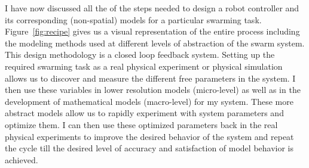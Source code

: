 \documentclass[defaultstyle,12pt]{proposal}
\begin{document}
I have now discussed all the of the steps needed to design a robot controller and its corresponding (non-spatial) models for a particular swarming task. Figure~\ref{fig:recipe} gives us a visual representation of the entire process including the modeling methods used at different levels of abstraction of the swarm system. This design methodology is a closed loop feedback system. Setting up the required swarming task as a real physical experiment or physical simulation allows us to discover and measure the different free parameters in the system. I then use these variables in lower resolution models (micro-level) as well as in the development of mathematical models (macro-level) for my system. These more abstract models allow us to rapidly experiment with system parameters and optimize them. I can then use these optimized parameters back in the real physical experiments to improve the desired behavior of the system and repeat the cycle till the desired level of accuracy and satisfaction of  model behavior is achieved.
\end{document}
